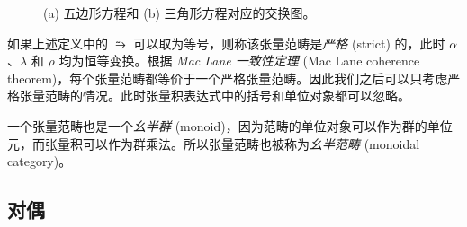 \begin{figure}[htb]
  \centering
   \quad
  \caption[五边形方程和三角形方程对应的交换图]{(a) 五边形方程和 (b) 三角形方程对应的交换图。}
  \label{fig:pentagon-triangle-equation}
\end{figure}

如果上述定义中的 $\similarrightarrow$ 可以取为等号，则称该张量范畴是\emph{严格} (strict) 的，此时 $\alpha$、$\lambda$ 和 $\rho$ 均为恒等变换。根据 \emph{Mac Lane 一致性定理} (Mac Lane coherence theorem)，每个张量范畴都等价于一个严格张量范畴\cite{maclane2013categories}。因此我们之后可以只考虑严格张量范畴的情况。此时张量积表达式中的括号和单位对象都可以忽略。

一个张量范畴也是一个\emph{幺半群} (monoid)，因为范畴的单位对象可以作为群的单位元，而张量积可以作为群乘法。所以张量范畴也被称为\emph{幺半范畴} (monoidal category)。

\subsection{对偶}

